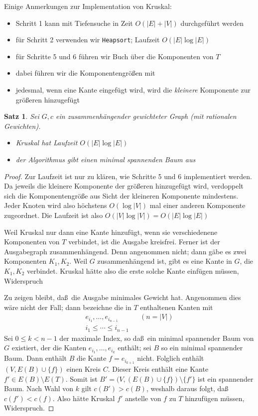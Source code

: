 \documentclass[10pt,reqno]{amsart}
\numberwithin{equation}{section}
\newtheorem{theorem}[definition]{Satz}
\begin{document}
Einige Anmerkungen zur Implementation von Kruskal:
	\begin{itemize}
		\item Schritt 1 kann mit Tiefensuche in Zeit $O(|E|+|V|)$ durchgef\"uhrt werden
		\item f\"ur Schritt 2 verwenden wir {\tt Heapsort}; Laufzeit $O(|E|\log|E|)$
		\item f\"ur Schritte 5 und 6 f\"uhren wir Buch \"uber die Komponenten von $T$
		\item dabei f\"uhren wir die Komponentengr\"o\ss en mit
		\item jedesmal, wenn eine Kante eingef\"ugt wird, wird die \emph{kleinere} Komponente zur gr\"o\ss eren hinzugef\"ugt
	\end{itemize}

	\begin{theorem}\label{thm_kruskal}
			Sei $G,c$ ein zusammenh\"angender gewichteter Graph (mit rationalen Gewichten).
			\begin{itemize}
				\item Kruskal hat Laufzeit $O(|E|\log|E|)$
				\item der Algorithmus gibt einen minimal spannenden Baum aus
			\end{itemize}
	\end{theorem}
\begin{proof}
	Zur Laufzeit ist nur zu kl\"aren, wie Schritte 5 und 6 implementiert werden.
	Da jeweils die kleinere Komponente der gr\"o\ss eren hinzugef\"ugt wird, verdoppelt sich die Komponentengr\"o\ss e aus Sicht der kleineren Komponente mindestens.
	Jeder Knoten wird also h\"ochstens $O(\log|V|)$ mal einer anderen Komponente zugeordnet.
	Die Laufzeit ist also $O(|V|\log|V|)=O(|E|\log|E|)$

	Weil Kruskal nur dann eine Kante hinzuf\"ugt, wenn sie verschiedenene Komponenten von $T$ verbindet, ist die Ausgabe kreisfrei.
	Ferner ist der Ausgabegraph zusammenh\"angend.
	Denn angenommen nicht; dann g\"abe es zwei Komponenten $K_1,K_2$.
	Weil $G$ zusammenh\"angend ist, gibt es eine Kante in $G$, die $K_1,K_2$ verbindet.
	Kruskal h\"atte also die erste solche Kante einf\"ugen m\"ussen, Widerspruch

	Zu zeigen bleibt, da\ss\ die Ausgabe minimales Gewicht hat.
	Angenommen dies w\"are nicht der Fall; dann bezeichne die in $T$ enthaltenen Kanten mit
	\begin{align*}
		e_{i_1},\ldots,e_{i_{n-1}}&&(n=|V|)\\
		i_1\leq\cdots\leq i_{n-1}
	\end{align*}
	Sei $0\leq k<n-1$ der maximale Index, so da\ss\ ein minimal spannender Baum von $G$ existiert, der die Kanten $e_{i_1},\ldots,e_{i_k}$ enth\"alt; sei $B$ so ein minimal spannender Baum.
	Dann enth\"alt $B$ die Kante $f=e_{i_{k+1}}$ nicht.
	Folglich enth\"alt $(V,E(B)\cup\{f\})$ einen Kreis $C$.
	Dieser Kreis enth\"alt eine Kante $f'\in E(B)\setminus E(T)$.
	Somit ist $B'=(V,(E(B)\cup\{f\})\setminus\{f'\}$ ist ein spannender Baum.
	Nach Wahl von $k$ gilt $c(B')>c(B)$, weshalb daraus folgt, da\ss\ $c(f')<c(f)$.
	Also h\"atte Kruskal $f'$ anstelle von $f$ zu $T$ hinzuf\"ugen m\"ussen, Widerspruch.
\end{proof}
\end{document}
